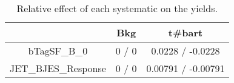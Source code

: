 \documentclass[10pt]{article}
\begin{document}
\begin{table}[htbp]
\begin{center}
\begin{tabular}{|c|c|c|}
\hline 
      & Bkg      & t#bar{t} \\ 
\hline 
  bTagSF_B_0 & 0 / 0 & 0.0228 / -0.0228 \\ 
  JET_BJES_Response & 0 / 0 & 0.00791 / -0.00791 \\ 
\hline 
\end{tabular} 
\caption{Relative effect of each systematic on the yields.} 
\end{center} 
\end{table} 
\end{document}
